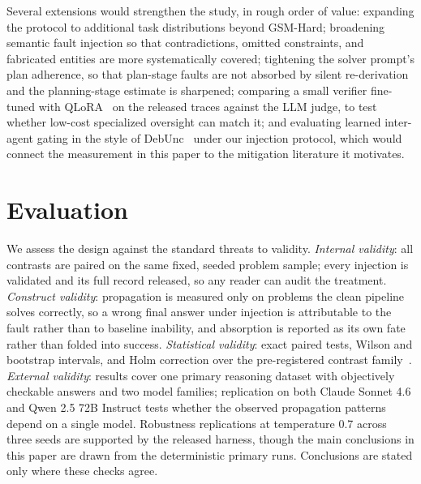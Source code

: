 \documentclass{article}
\begin{document}
Several extensions would strengthen the study, in rough order of value:
expanding the protocol to additional task distributions beyond GSM-Hard;
broadening semantic fault injection so that contradictions, omitted
constraints, and fabricated entities are more systematically covered;
tightening the solver prompt's plan adherence, so that plan-stage faults are
not absorbed by silent re-derivation and the planning-stage estimate is
sharpened; comparing a small verifier fine-tuned with QLoRA~\citep{dettmers2023qlora}
on the released traces against the LLM judge, to test whether low-cost
specialized oversight can match it; and evaluating learned inter-agent
gating in the style of DebUnc~\citep{yoffe2024debunc} under our injection
protocol, which would connect the measurement in this paper to the
mitigation literature it motivates.

\section{Evaluation}
We assess the design against the standard threats to validity.
\emph{Internal validity}: all contrasts are paired on the same fixed,
seeded problem sample; every injection is validated and its full record
released, so any reader can audit the treatment. \emph{Construct validity}:
propagation is measured only on problems the clean pipeline solves
correctly, so a wrong final answer under injection is attributable to the
fault rather than to baseline inability, and absorption is reported as its
own fate rather than folded into success. \emph{Statistical validity}: exact
paired tests, Wilson and bootstrap intervals, and Holm correction over the
pre-registered contrast family~\citep{dror2018hitchhiker}. \emph{External
validity}: results cover one primary reasoning dataset with objectively
checkable answers and two model families; replication on both Claude Sonnet
4.6 and Qwen 2.5 72B Instruct tests whether the observed propagation
patterns depend on a single model. Robustness replications at temperature
0.7 across three seeds are supported by the released harness, though the
main conclusions in this paper are drawn from the deterministic primary
runs. Conclusions are stated only where these checks agree.
\end{document}
